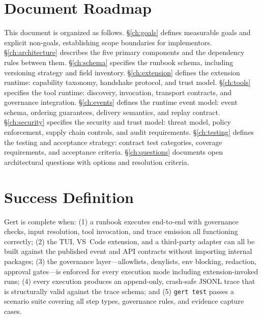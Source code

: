 \section{Document Roadmap}

This document is organized as follows. \S\ref{ch:goals} defines measurable goals and explicit
non-goals, establishing scope boundaries for implementors. \S\ref{ch:architecture} describes the five
primary components and the dependency rules between them. \S\ref{ch:schema} specifies the runbook
schema, including versioning strategy and field inventory. \S\ref{ch:extension}
defines the extension runtime: capability taxonomy, handshake protocol, and trust model.
\S\ref{ch:tools} specifies the tool runtime: discovery, invocation, transport contracts, and governance
integration. \S\ref{ch:events} defines the runtime event model: event schema, ordering guarantees,
delivery semantics, and replay contract. \S\ref{ch:security} specifies the security and trust model:
threat model, policy enforcement, supply chain controls, and audit requirements. \S\ref{ch:testing}
defines the testing and acceptance strategy: contract test categories, coverage requirements, and
acceptance criteria. \S\ref{ch:questions} documents open architectural questions with options and
resolution criteria.

\section{Success Definition}

Gert is complete when: (1) a runbook executes end-to-end with governance checks, input resolution,
tool invocation, and trace emission all functioning correctly; (2) the TUI, VS~Code extension, and a third-party adapter can all be
built against the published event and API contracts without importing internal packages; (3) the
governance layer---allowlists, denylists, env blocking, redaction, approval gates---is enforced for
every execution mode including extension-invoked runs; (4) every execution produces an append-only,
crash-safe JSONL trace that is structurally valid against the trace schema; and (5) \texttt{gert
test} passes a scenario suite covering all step types, governance rules, and evidence capture cases.
